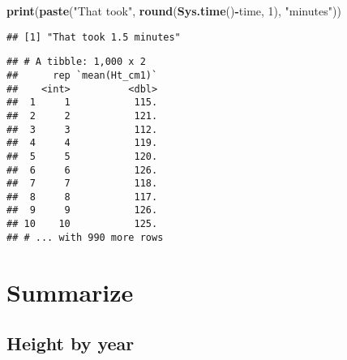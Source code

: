 \documentclass[]{article}
\newenvironment{Shaded}{\begin{snugshade}}{\end{snugshade}}
\newcommand{\KeywordTok}[1]{\textcolor[rgb]{0.13,0.29,0.53}{\textbf{#1}}}
\newcommand{\DataTypeTok}[1]{\textcolor[rgb]{0.13,0.29,0.53}{#1}}
\newcommand{\DecValTok}[1]{\textcolor[rgb]{0.00,0.00,0.81}{#1}}
\newcommand{\StringTok}[1]{\textcolor[rgb]{0.31,0.60,0.02}{#1}}
\newcommand{\OperatorTok}[1]{\textcolor[rgb]{0.81,0.36,0.00}{\textbf{#1}}}
\newcommand{\NormalTok}[1]{#1}
\begin{document}
\begin{Shaded}
\begin{Highlighting}[]
\KeywordTok{print}\NormalTok{(}\KeywordTok{paste}\NormalTok{(}\StringTok{"That took"}\NormalTok{, }\KeywordTok{round}\NormalTok{(}\KeywordTok{Sys.time}\NormalTok{()}\OperatorTok{-}\NormalTok{time, }\DecValTok{1}\NormalTok{), }\StringTok{"minutes"}\NormalTok{))}
\end{Highlighting}
\end{Shaded}

\begin{verbatim}
## [1] "That took 1.5 minutes"
\end{verbatim}

\begin{Shaded}
\end{Shaded}

\begin{verbatim}
## # A tibble: 1,000 x 2
##      rep `mean(Ht_cm1)`
##    <int>          <dbl>
##  1     1           115.
##  2     2           121.
##  3     3           112.
##  4     4           119.
##  5     5           120.
##  6     6           126.
##  7     7           118.
##  8     8           117.
##  9     9           126.
## 10    10           125.
## # ... with 990 more rows
\end{verbatim}

\section{Summarize}\label{summarize}

\subsection{Height by year}\label{height-by-year}

\begin{Shaded}
\end{Shaded}
\end{document}
